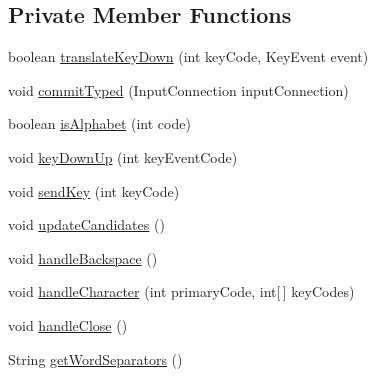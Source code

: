 \subsection*{Private Member Functions}
\begin{DoxyCompactItemize}
\item 
boolean \hyperlink{classch_1_1zhaw_1_1ba10__bsha__1_1_1ime_1_1HandwritingIME_a25b3410857b8a7b81ad09b2a76ca352c}{translateKeyDown} (int keyCode, KeyEvent event)
\item 
void \hyperlink{classch_1_1zhaw_1_1ba10__bsha__1_1_1ime_1_1HandwritingIME_a3f0ca3d6a23ac27b9ad1b2578078512e}{commitTyped} (InputConnection inputConnection)
\item 
boolean \hyperlink{classch_1_1zhaw_1_1ba10__bsha__1_1_1ime_1_1HandwritingIME_a0cc6d7c254ce701f73f5852bafe294b4}{isAlphabet} (int code)
\item 
void \hyperlink{classch_1_1zhaw_1_1ba10__bsha__1_1_1ime_1_1HandwritingIME_acaadb74527ea7fc306cdd571b9a25097}{keyDownUp} (int keyEventCode)
\item 
void \hyperlink{classch_1_1zhaw_1_1ba10__bsha__1_1_1ime_1_1HandwritingIME_a2711e357f6251b532e7d0bde79cadfdf}{sendKey} (int keyCode)
\item 
void \hyperlink{classch_1_1zhaw_1_1ba10__bsha__1_1_1ime_1_1HandwritingIME_a428fc59e616bef0e75c866ddece97a70}{updateCandidates} ()
\item 
void \hyperlink{classch_1_1zhaw_1_1ba10__bsha__1_1_1ime_1_1HandwritingIME_a629b38e45bc795d46cb7ce1c79bc1def}{handleBackspace} ()
\item 
void \hyperlink{classch_1_1zhaw_1_1ba10__bsha__1_1_1ime_1_1HandwritingIME_a5b7f7f06b8e6f5eb9797725b5d814f5c}{handleCharacter} (int primaryCode, int\mbox{[}$\,$\mbox{]} keyCodes)
\item 
void \hyperlink{classch_1_1zhaw_1_1ba10__bsha__1_1_1ime_1_1HandwritingIME_a4287014b4f552f286e8b51ef841573b1}{handleClose} ()
\item 
String \hyperlink{classch_1_1zhaw_1_1ba10__bsha__1_1_1ime_1_1HandwritingIME_aedc68ffb6a0f14256976a0cfdb5a8a3d}{getWordSeparators} ()
\end{DoxyCompactItemize}
